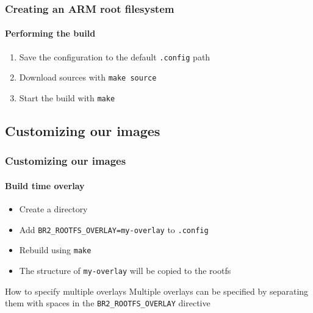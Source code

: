 \begin{frame}
  \frametitle{Creating an ARM root filesystem}
  \framesubtitle{Performing the build}
  \begin{enumerate}
    \item Save the configuration to the default \texttt{.config} path
    \item Download sources with \texttt{make source}
    \item Start the build with \texttt{make}
  \end{enumerate}
\end{frame}
\subsection{Customizing our images}
\begin{frame}[label={Customizing our images}]
  \frametitle{Customizing our images}
  \framesubtitle{Build time overlay}
  \begin{itemize}
    \item Create a directory
    \item Add \texttt{BR2\_ROOTFS\_OVERLAY=my-overlay} to \texttt{.config}
    \item Rebuild using \texttt{make}
    \item The structure of \texttt{my-overlay} will be copied to the rootfs
  \end{itemize}
  \begin{block}{How to specify multiple overlays}
    Multiple overlays can be specified by separating them with spaces in the \texttt{BR2\_ROOTFS\_OVERLAY} directive
  \end{block}
\end{frame}

